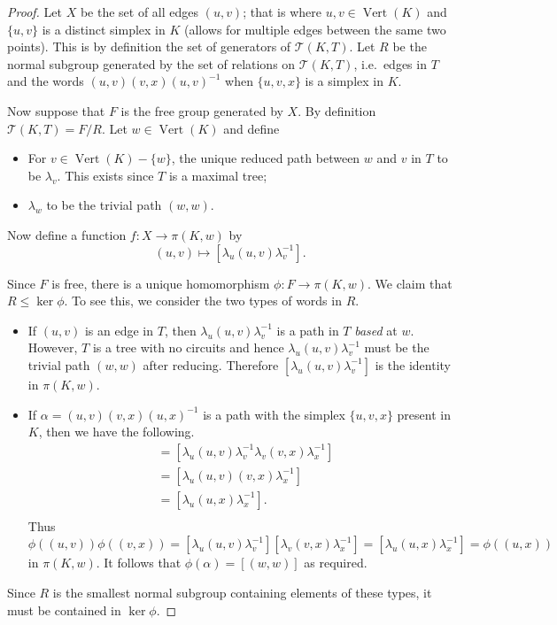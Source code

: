 \begin{proof}
  Let $X$ be the set of all edges $(u,v)$; that is where $u,v \in \operatorname{Vert}(K)$ and $\{ u,v \}$ is a distinct simplex in $K$ (allows for multiple edges between the same two points). This is by definition the set of generators of $\mathcal{T}(K,T)$. Let $R$ be the normal subgroup generated by the set of relations on $\mathcal{T}(K,T)$, i.e.\ edges in $T$ and the words $(u,v)(v,x)(u,v)^{-1}$ when $\{u,v,x \}$ is a simplex in $K$.

  Now suppose that $F$ is the free group generated by $X$. By definition $\mathcal{T}(K,T) = F/R$. Let $w \in \operatorname{Vert}(K)$ and define
  \begin{itemize}
  \item For $v \in \operatorname{Vert}(K) - \{w\}$, the unique reduced path between $w$ and $v$ in $T$ to be $\lambda_v$. This exists since $T$ is a maximal tree;
  \item $\lambda_w$ to be the trivial path $(w,w)$.
  \end{itemize}

Now define a function $f:X \rightarrow \pi(K,w)$ by
\begin{equation*}
  (u,v) \mapsto [\lambda_u(u,v)\lambda_v^{-1}].
\end{equation*}

Since $F$ is free, there is a unique homomorphism $\phi: F \rightarrow \pi(K,w)$. We claim that $R \leq \ker \phi$. To see this, we consider the two types of words in $R$.
\begin{itemize}
\item If $(u,v)$ is an edge in $T$, then $\lambda_u (u,v) \lambda_v^{-1}$ is a path in $T$ \emph{based} at $w$. However, $T$ is a tree with no circuits and hence $\lambda_u (u,v) \lambda_v^{-1}$ must be the trivial path $(w,w)$ after reducing. Therefore $[\lambda_u (u,v) \lambda_v^{-1}]$ is the identity in $\pi(K,w)$.
\item If $\alpha = (u,v)(v,x)(u,x)^{-1}$ is a path with the simplex $\{ u,v,x \}$ present in $K$, then we have the following.
  \begin{align*}
    [\lambda_u (u,v) \lambda_v^{-1}][\lambda_v (v,x) \lambda_x^{-1}] &= [\lambda_u (u,v) \lambda_v^{-1}\lambda_v (v,x) \lambda_x^{-1}] \\
                                                                     &= [\lambda_u (u,v)(v,x) \lambda_x^{-1}] \\
                                                                     &= [\lambda_u (u,x) \lambda_x^{-1}]. \\
  \end{align*}
  Thus $\phi((u,v))\phi((v,x)) = [\lambda_u (u,v) \lambda_v^{-1}][\lambda_v (v,x) \lambda_x^{-1}] = [\lambda_u (u,x) \lambda_x^{-1}] = \phi((u,x))$ in $\pi(K,w)$. It follows that $\phi(\alpha) = [(w,w)]$ as required.
\end{itemize}
Since $R$ is the smallest normal subgroup containing elements of these types, it must be contained in $\ker \phi$.


\end{proof}
